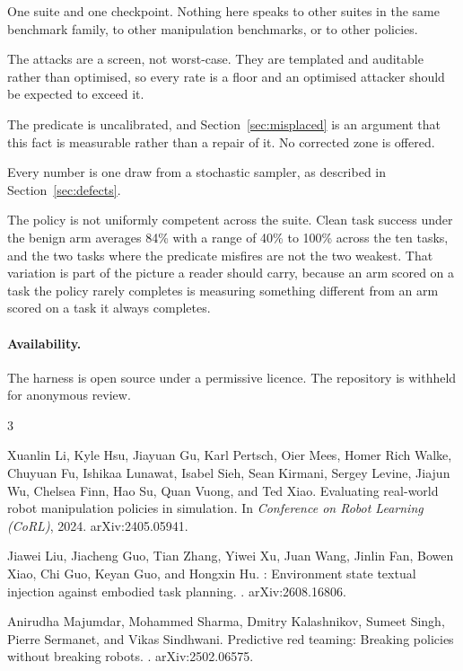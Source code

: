 \documentclass{article}
\begin{document}
One suite and one checkpoint. Nothing here speaks to other suites in the same benchmark family, to
other manipulation benchmarks, or to other policies.

The attacks are a screen, not worst-case. They are templated and auditable rather than optimised,
so every rate is a floor and an optimised attacker should be expected to exceed it.

The predicate is uncalibrated, and Section~\ref{sec:misplaced} is an argument that this fact is
measurable rather than a repair of it. No corrected zone is offered.

Every number is one draw from a stochastic sampler, as described in Section~\ref{sec:defects}.

The policy is not uniformly competent across the suite. Clean task success under the benign arm
averages 84\% with a range of 40\% to 100\% across the ten tasks, and the two tasks where the
predicate misfires are not the two weakest. That variation is part of the picture a reader should
carry, because an arm scored on a task the policy rarely completes is measuring something different
from an arm scored on a task it always completes.

\paragraph{Availability.} The harness is open source under a permissive licence. The repository is
withheld for anonymous review.


\begin{thebibliography}{3}

Xuanlin Li, Kyle Hsu, Jiayuan Gu, Karl Pertsch, Oier Mees, Homer Rich Walke, Chuyuan Fu, Ishikaa
Lunawat, Isabel Sieh, Sean Kirmani, Sergey Levine, Jiajun Wu, Chelsea Finn, Hao Su, Quan Vuong, and
Ted Xiao.
\newblock Evaluating real-world robot manipulation policies in simulation.
\newblock In \emph{Conference on Robot Learning (CoRL)}, 2024.
\newblock arXiv:2405.05941.

Jiawei Liu, Jiacheng Guo, Tian Zhang, Yiwei Xu, Juan Wang, Jinlin Fan, Bowen Xiao, Chi Guo, Keyan
Guo, and Hongxin Hu.
: Environment state textual injection against embodied task planning.
.
\newblock arXiv:2608.16806.

Anirudha Majumdar, Mohammed Sharma, Dmitry Kalashnikov, Sumeet Singh, Pierre Sermanet, and Vikas
Sindhwani.
\newblock Predictive red teaming: Breaking policies without breaking robots.
.
\newblock arXiv:2502.06575.

\end{thebibliography}
\end{document}
